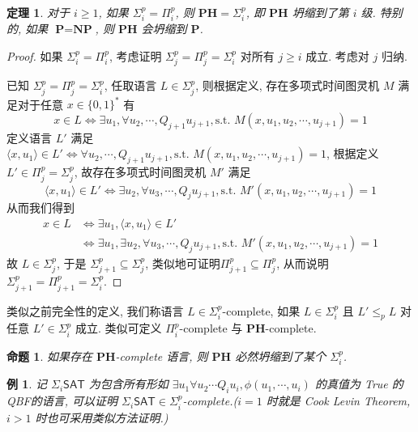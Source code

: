 \documentclass[8pt]{article}
\theoremstyle{compact}
\newtheorem{theorem}{定理}[section]
\newtheorem{proposition}{命题}[section]
\newtheorem{example}{例}[section]
\def\le{\leqslant}
\def\ge{\geqslant}
\def\P{\textbf{P}}
\def\NP{\textbf{NP}}
\def\PH{\textbf{PH}}
\begin{document}
\begin{theorem}
	对于 $i \ge 1$, 如果 $\Sigma_i^p = \Pi_i^p$, 则 $\PH = \Sigma_i^p$, 即 $\PH$ 坍缩到了第 $i$ 级. 特别的, 如果 $\P = \NP$, 则 $\PH$ 会坍缩到 $\P$. 
\end{theorem}
\begin{proof}
	如果 $\Sigma_i^p = \Pi_i^p$, 考虑证明 $\Sigma_j^p = \Pi_j^p = \Sigma_i^p$ 对所有 $j \ge i$ 成立. 考虑对 $j$ 归纳.

	已知 $\Sigma_j^p = \Pi_j^p = \Sigma_i^p$, 任取语言 $L \in \Sigma_j^p$, 则根据定义, 存在多项式时间图灵机 $M$ 满足对于任意 $x \in \{0, 1\}^*$ 有 $$x \in L \Leftrightarrow \exists u_1, \forall u_2, \cdots, Q_{j+1} u_{j+1}, \text{s.t. } M(x, u_1, u_2, \cdots, u_{j+1}) = 1$$
	定义语言 $L'$ 满足 $\langle x, u_1 \rangle \in L' \Leftrightarrow \forall u_2, \cdots, Q_{j+1} u_{j+1}, \text{s.t. } M(x, u_1, u_2, \cdots, u_{j+1}) = 1$, 根据定义 $L' \in \Pi_j^p = \Sigma_j^p$, 故存在多项式时间图灵机 $M'$ 满足$$\langle x, u_1 \rangle \in L' \Leftrightarrow \exists u_2, \forall u_3, \cdots, Q_j u_{j+1}, \text{s.t. } M'(x, u_1, u_2, \cdots, u_{j+1}) = 1$$
	从而我们得到 \begin{equation*}
		\begin{split}
			x \in L &\Leftrightarrow \exists u_1, \langle x, u_1 \rangle \in L' \\
			&\Leftrightarrow \exists u_1, \exists u_2, \forall u_3, \cdots, Q_j u_{j+1}, \text{s.t. } M'(x, u_1, u_2, \cdots, u_{j+1}) = 1
		\end{split}
	\end{equation*}
	故 $L \in \Sigma_j^p$, 于是 $\Sigma_{j+1}^p \subseteq \Sigma_j^p$, 类似地可证明$\Pi_{j+1}^p \subseteq \Pi_j^p$, 从而说明 $\Sigma_{j+1}^p = \Pi_{j+1}^p = \Sigma_i^p$.
\end{proof}


类似之前完全性的定义, 我们称语言 $L \in \Sigma_i^p$-complete, 如果 $L \in \Sigma_i^p$ 且 $L' \le_p L$ 对任意 $L' \in \Sigma_i^p$ 成立. 类似可定义 $\Pi_i^p$-complete 与 $\PH$-complete.

\begin{proposition}
	如果存在 $\PH$-complete 语言, 则 $\PH$ 必然坍缩到了某个 $\Sigma_i^p$.
\end{proposition}

\begin{example}
	记 $\Sigma_i\textsf{SAT}$ 为包含所有形如 $\exists u_1 \forall u_2 \cdots Q_iu_i, \phi(u_1, \cdots, u_i)$ 的真值为 True 的 QBF的语言, 可以证明 $\Sigma_i\textsf{SAT} \in \Sigma_i^p$-complete.($i = 1$ 时就是 Cook Levin Theorem, $i > 1$ 时也可采用类似方法证明.)
\end{example}
\end{document}
